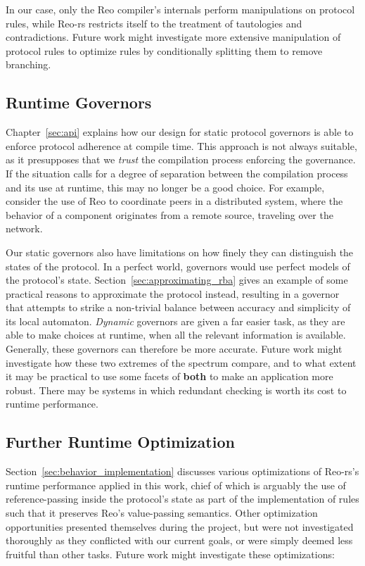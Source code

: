 In our case, only the Reo compiler's internals perform manipulations on protocol rules, while Reo-rs restricts itself to the treatment of tautologies and contradictions. Future work might investigate more extensive manipulation of protocol rules to optimize rules by conditionally splitting them to remove branching.

\subsection{Runtime Governors}
Chapter~\ref{sec:api} explains how our design for static protocol governors is able to enforce protocol adherence at compile time. This approach is not always suitable, as it presupposes that we \textit{trust} the compilation process enforcing the governance. If the situation calls for a degree of separation between the compilation process and its use at runtime, this may no longer be a good choice. For example, consider the use of Reo to coordinate peers in a distributed system, where the behavior of a component originates from a remote source, traveling over the network.

Our static governors also have limitations on how finely they can distinguish the states of the protocol. In a perfect world, governors would use perfect models of the protocol's state. Section~\ref{sec:approximating_rba} gives an example of some practical reasons to approximate the protocol instead, resulting in a governor that attempts to strike a non-trivial balance between accuracy and simplicity of its local automaton. \textit{Dynamic} governors are given a far easier task, as they are able to make choices at runtime, when all the relevant information is available. Generally, these governors can therefore be more accurate. Future work might investigate how these two extremes of the spectrum compare, and to what extent it may be practical to use some facets of \textbf{both} to make an application more robust. There may be systems in which redundant checking is worth its cost to runtime performance.

\subsection{Further Runtime Optimization}
Section~\ref{sec:behavior_implementation} discusses various optimizations of Reo-rs's runtime performance applied in this work, chief of which is arguably the use of reference-passing inside the protocol's state as part of the implementation of rules such that it preserves Reo's value-passing semantics. Other optimization opportunities presented themselves during the project, but were not investigated thoroughly as they conflicted with our current goals, or were simply deemed less fruitful than other tasks. Future work might investigate these optimizations:

